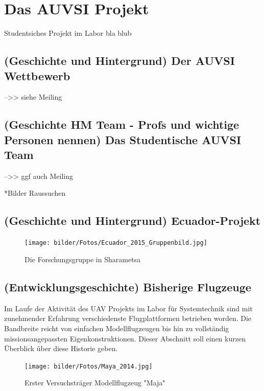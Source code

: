 \chapter{Das AUVSI Projekt}\label{cha:Das AUVSI Projekt}

Studentsiches Projekt im Labor  bla blub

\section{(Geschichte und Hintergrund) Der AUVSI Wettbewerb}

\cite{AUVSIrules}

\cite{Meiling}

-->> siehe Meiling 

\section{(Geschichte HM Team - Profs und wichtige Personen nennen) Das Studentische AUVSI Team}

-->> ggf auch Meiling

*Bilder Raussuchen

\section{(Geschichte und Hintergrund) Ecuador-Projekt}

\cite{Niclas}

\begin{figure}[H]
\centering
\texttt{[image: bilder/Fotos/Ecuador\_2015\_Gruppenbild.jpg]} 
\caption{Die Forschungsgruppe in Sharametsa} 
\label{Die Forschungsgruppe in Sharametsa}
\end{figure}


\section{(Entwicklungsgeschichte) Bisherige Flugzeuge}

Im Laufe der Aktivität des UAV Projekts im Labor für Systemtechnik sind mit zunehmender Erfahrung verschiedenste Flugplattformen betrieben worden. Die Bandbreite reicht von einfachen Modellflugzeugen bis hin zu vollständig missionsangepassten Eigenkonstruktionen.
Dieser Abschnitt soll einen kurzen Überblick über diese Historie geben.

\begin{figure}[H]
\centering
\texttt{[image: bilder/Fotos/Maya\_2014.jpg]} 
\caption{Erster Versuchsträger Modellflugzeug "Maja"} 
\label{Erster Versuchsträger Modellflugzeug "Maja"}
\end{figure}

